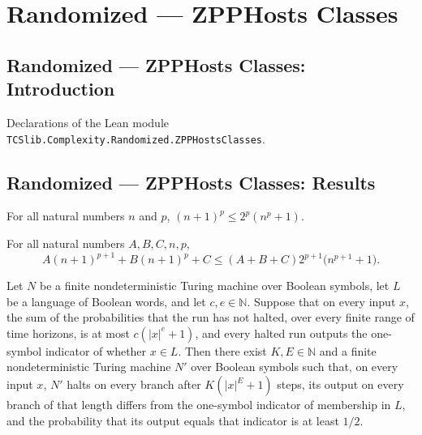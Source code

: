 \section{Randomized --- ZPPHosts Classes}
\subsection*{Randomized --- ZPPHosts Classes: Introduction}

Declarations of the Lean module \texttt{TCSlib.Complexity.Randomized.ZPPHostsClasses}.

\subsection*{Randomized --- ZPPHosts Classes: Results}

\begin{theorem}
\label{Randomized.succ_pow_le_two_pow_mul}
\leanok
{}
For all natural numbers $n$ and $p$, $(n+1)^p \le 2^p(n^p+1)$.
\end{theorem}

\begin{theorem}
\label{Randomized.add_mul_succ_pow_le}
\leanok
{}
For all natural numbers $A,B,C,n,p$, $$A(n+1)^{p+1}+B(n+1)^p+C\le
(A+B+C)2^{p+1}\bigl(n^{p+1}+1\bigr).$$
\end{theorem}

\begin{theorem}
\label{Turing.FinNDTM.ZDecidesInTime.exists_abortDecidesInTime}
\leanok
{}
Let $N$ be a finite nondeterministic Turing machine over Boolean symbols, let $L$ be a
language of Boolean words, and let $c,e\in\mathbb{N}$. Suppose that on every input $x$,
the sum of the probabilities that the run has not halted, over every finite range of
time horizons, is at most $c(|x|^e+1)$, and every halted run outputs the one-symbol
indicator of whether $x\in L$. Then there exist $K,E\in\mathbb{N}$ and a finite
nondeterministic Turing machine $N'$ over Boolean symbols such that, on every input $x$,
$N'$ halts on every branch after $K(|x|^E+1)$ steps, its output on every branch of that
length differs from the one-symbol indicator of membership in $L$, and the probability
that its output equals that indicator is at least $1/2$.
\end{theorem}


